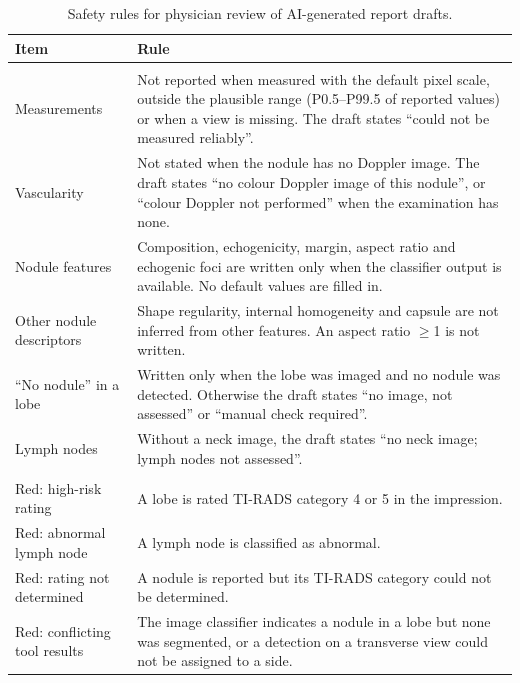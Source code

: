 \begin{table}[p]
\centering
\begin{threeparttable}
\caption{Safety rules for physician review of AI-generated report drafts.}
\label{tab:safety_rules}

\footnotesize
\setlength{\tabcolsep}{5.0pt}
\renewcommand{\arraystretch}{1.12}

\begin{tabular}{>{\raggedright\arraybackslash}p{}>{\raggedright\arraybackslash}p{}}
\toprule
\textbf{Item} & \textbf{Rule} \\
\midrule
\rowcolor{gray!20}
\multicolumn{2}{c}{\textbf{Layer 1: statements not written}} \\
Measurements & Not reported when measured with the default pixel scale, outside the plausible range (P0.5--P99.5 of reported values) or when a view is missing. The draft states ``could not be measured reliably''. \\
Vascularity & Not stated when the nodule has no Doppler image. The draft states ``no colour Doppler image of this nodule'', or ``colour Doppler not performed'' when the examination has none. \\
Nodule features & Composition, echogenicity, margin, aspect ratio and echogenic foci are written only when the classifier output is available. No default values are filled in. \\
Other nodule descriptors & Shape regularity, internal homogeneity and capsule are not inferred from other features. An aspect ratio $\geq$1 is not written. \\
``No nodule'' in a lobe & Written only when the lobe was imaged and no nodule was detected. Otherwise the draft states ``no image, not assessed'' or ``manual check required''. \\
Lymph nodes & Without a neck image, the draft states ``no neck image; lymph nodes not assessed''. \\
\midrule
\rowcolor{gray!20}
\multicolumn{2}{c}{\textbf{Layer 2: sentence marks for physician review}} \\
Red: high-risk rating & A lobe is rated TI-RADS category 4 or 5 in the impression. \\
Red: abnormal lymph node & A lymph node is classified as abnormal. \\
Red: rating not determined & A nodule is reported but its TI-RADS category could not be determined. \\
Red: conflicting tool results & The image classifier indicates a nodule in a lobe but none was segmented, or a detection on a transverse view could not be assigned to a side. \\

\end{tabular}
\end{threeparttable}
\end{table}
